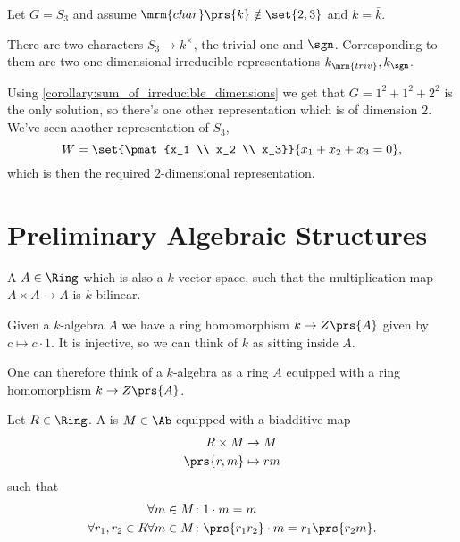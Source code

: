 \documentclass[10pt,a4paper,twoside,openany,hidelinks]{book}
\begin{document}
\begin{example}
Let $G = S_3$ and assume $\mrm{char}\prs{k} \notin \set{2,3}$ and $k = \bar{k}$.

There are two characters $S_3 \to k^\times$, the trivial one and $\sgn$.
Corresponding to them are two one-dimensional irreducible representations $k_{\mrm{triv}}, k_{\sgn}$.

Using \ref{corollary:sum_of_irreducible_dimensions} we get that
$G = 1^2 + 1^2 + 2^2$
is the only solution, so there's one other representation which is of dimension $2$.
We've seen another representation of $S_3$,
\[W = \set{\pmat{x_1 \\ x_2 \\ x_3}}{x_1 + x_2 + x_3 = 0} \text{,}\]
which is then the required $2$-dimensional representation.
\end{example}


\chapter{Preliminary Algebraic Structures}

\begin{definition}[$k$-Algebra]
A  $A \in \Ring$ which is also a $k$-vector space, such that the multiplication map $A \times A \to A$ is $k$-bilinear.
\end{definition}

\begin{remark}
Given a $k$-algebra $A$ we have a ring homomorphism $k \to Z\prs{A}$ given by $c \mapsto c \cdot 1$. It is injective, so we can think of $k$ as sitting inside $A$.

One can therefore think of a $k$-algebra as a ring $A$ equipped with a ring homomorphism $k \to Z\prs{A}$.
\end{remark}

\begin{definition}[Module]
Let $R \in \Ring$. A  is $M \in \Ab$ equipped with a biadditive map
\begin{align*}
R \times M &\to M \\
\prs{r,m} &\mapsto rm
\end{align*}
such that
\begin{align*}
\forall m \in M \colon & 1 \cdot m = m \\
\forall r_1, r_2 \in R \forall m \in M \colon & \prs{r_1 r_2} \cdot m = r_1 \prs{r_2 m} \text{.}
\end{align*}
\end{definition}
\end{document}
